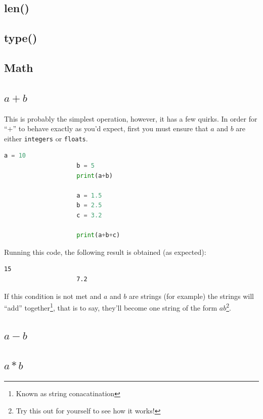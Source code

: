 \documentclass[12pt,a4paper]{book}
\begin{document}
			\subsection{len()}
				\vspace{7cm}
			\subsection{type()}

			\subsection{Math}
				\subsection{$a+b$}
					This is probably the simplest operation, however, it has a few quirks. In order for ``$+$'' to behave exactly as you'd expect, first you must ensure that $a$ and $b$ are either \texttt{integers} or \texttt{floats}.
					\begin{lstlisting}[language=python]
					a = 10 
					b = 5
					print(a+b)

					a = 1.5
					b = 2.5
					c = 3.2

					print(a+b+c)
					\end{lstlisting}

					Running this code, the following result is obtained (as expected):
					\begin{lstlisting}[style=console]
					15
					7.2
					\end{lstlisting}

					If this condition is not met and $a$ and $b$ are strings (for example) the strings will ``add'' together\footnote{Known as string conacatination}, that is to say, they'll become one string of the form $ab$\footnote{Try this out for yourself to see how it works!}.

					\vspace{3cm}

				\subsection{$a-b$}
					\vspace{3cm}

				\subsection{$a*b$}
					\vspace{3cm}
\end{document}
